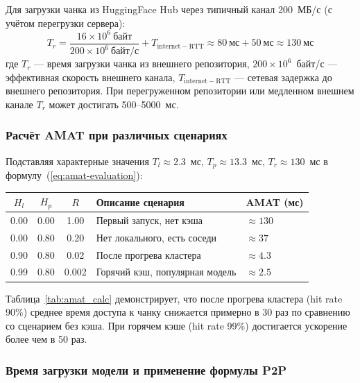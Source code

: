 Для загрузки чанка из HuggingFace Hub через типичный канал 200~МБ/с (с учётом перегрузки сервера):
\begin{equation}
  T_r = \frac{16 \times 10^6~\text{байт}}{200 \times 10^6~\text{байт/с}} + T_{\mathrm{internet-RTT}} \approx 80~\text{мс} + 50~\text{мс} \approx 130~\text{мс}
\end{equation}
где $T_r$ --- время загрузки чанка из внешнего репозитория, $200 \times 10^6$~байт/с --- эффективная скорость внешнего канала, $T_{\mathrm{internet-RTT}}$ --- сетевая задержка до внешнего репозитория.
При перегруженном репозитории или медленном внешнем канале $T_r$ может достигать 500--5000~мс.

\subsubsection{Расчёт AMAT при различных сценариях}

Подставляя характерные значения $T_l \approx 2.3$~мс, $T_p \approx 13.3$~мс, $T_r \approx 130$~мс в формулу~(\ref{eq:amat-evaluation}):

\begin{table}[htbp]
\centering
\tablebodyfont
\begin{tabularx}{\textwidth}{|c|c|c|>{\raggedright\arraybackslash}X|>{\centering\arraybackslash}p{24mm}|}
\hline
\textbf{$H_l$} & \textbf{$H_p$} & \textbf{$R$} & \textbf{Описание сценария} & \textbf{AMAT (мс)} \\ \hline
0.00 & 0.00 & 1.00 & Первый запуск, нет кэша & $\approx 130$ \\ \hline
0.00 & 0.80 & 0.20 & Нет локального, есть соседи & $\approx 37$ \\ \hline
0.90 & 0.80 & 0.02 & После прогрева кластера & $\approx 4.3$ \\ \hline
0.99 & 0.80 & 0.002 & Горячий кэш, популярная модель & $\approx 2.5$ \\
\hline
\end{tabularx}
\end{table}

Таблица~\ref{tab:amat_calc} демонстрирует, что после прогрева кластера (hit rate 90\%) среднее время доступа к чанку снижается примерно в 30 раз по сравнению со сценарием без кэша. При горячем кэше (hit rate 99\%) достигается ускорение более чем в 50 раз.

\subsubsection{Время загрузки модели и применение формулы P2P}

